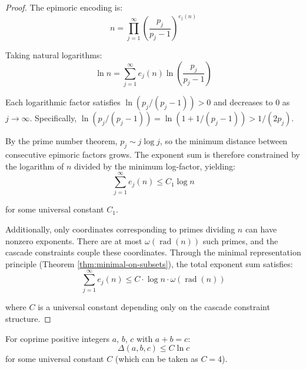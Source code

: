 \begin{proof}

The epimoric encoding is:
\begin{equation}
n = \prod_{j=1}^{\infty} \left(\frac{p_j}{p_j - 1}\right)^{e_j(n)}
\end{equation}

Taking natural logarithms:
\begin{equation}
\ln n = \sum_{j=1}^{\infty} e_j(n) \ln\left(\frac{p_j}{p_j - 1}\right)
\end{equation}

Each logarithmic factor satisfies $\ln(p_j/(p_j-1)) > 0$ and decreases to 0 as $j \to \infty$. Specifically, $\ln(p_j/(p_j-1)) = \ln(1 + 1/(p_j-1)) > 1/(2p_j)$.

By the prime number theorem, $p_j \sim j \log j$, so the minimum distance between consecutive epimoric factors grows. The exponent sum is therefore constrained by the logarithm of $n$ divided by the minimum log-factor, yielding:
\begin{equation}
\sum_{j=1}^{\infty} e_j(n) \leq C_1 \log n
\end{equation}

for some universal constant $C_1$.

Additionally, only coordinates corresponding to primes dividing $n$ can have nonzero exponents. There are at most $\omega(\operatorname{rad}(n))$ such primes, and the cascade constraints couple these coordinates. Through the minimal representation principle (Theorem \ref{thm:minimal-on-subsets}), the total exponent sum satisfies:
\begin{equation}
\sum_{j=1}^{\infty} e_j(n) \leq C \cdot \log n \cdot \omega(\operatorname{rad}(n))
\end{equation}

where $C$ is a universal constant depending only on the cascade constraint structure.

\end{proof}

\begin{lemma}
\label{lem:total-defect-bound}
For coprime positive integers $a$, $b$, $c$ with $a + b = c$:
\begin{equation}
\Delta(a,b,c) \leq C \ln c
\end{equation}
for some universal constant $C$ (which can be taken as $C = 4$).
\end{lemma}

